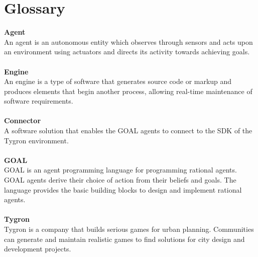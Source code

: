 \section{Glossary}

\textbf{Agent}\\
An agent is an autonomous entity which observes through sensors and acts upon an environment using actuators and directs its activity towards achieving goals.\\
\\
\textbf{Engine}\\
An engine is a type of software that generates source code or markup and produces elements that begin another process, allowing real-time maintenance of software requirements.\\
\\
\textbf{Connector}\\
A software solution that enables the GOAL agents to connect to the SDK of the Tygron environment.\\
\\
\textbf{GOAL}\\
GOAL is an agent programming language for programming rational agents. GOAL agents derive their choice of action from their beliefs and goals. The language provides the basic building blocks to design and implement rational agents. \\
\\
\textbf{Tygron}\\
Tygron is a company that builds serious games for urban planning. Communities can generate and maintain realistic games to find solutions for city design and development projects.\\
\\
\textbf{}
\textbf{}